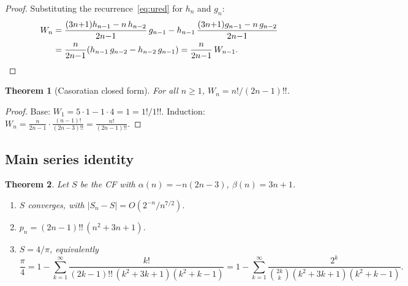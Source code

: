\documentclass[11pt,a4paper]{article}
\theoremstyle{plain}
\newtheorem{theorem}{Theorem}[section]
\theoremstyle{definition}
\theoremstyle{remark}
\newcommand{\dff}[1]{(#1)!!}
\begin{document}
\begin{proof}
Substituting the recurrence~\eqref{eq:ured} for $h_n$ and $g_n$:
\begin{align*}
  W_n
  &= \frac{(3n{+}1)h_{n-1} - n\,h_{n-2}}{2n{-}1}\,g_{n-1}
    - h_{n-1}\,\frac{(3n{+}1)g_{n-1} - n\,g_{n-2}}{2n{-}1} \\
  &= \frac{n}{2n{-}1}(h_{n-1}\,g_{n-2} - h_{n-2}\,g_{n-1})
   = \frac{n}{2n{-}1}\,W_{n-1}.\qedhere
\end{align*}
\end{proof}

\begin{theorem}[Casoratian closed form]\label{thm:cas}
For all $n \geq 1$,
$W_n = n!/\dff{2n{-}1}$.
\end{theorem}

\begin{proof}
Base: $W_1 = 5\cdot 1 - 1\cdot 4 = 1 = 1!/1!!$.
Induction:
$W_n = \frac{n}{2n{-}1}\cdot\frac{(n{-}1)!}{\dff{2n{-}3}}
= \frac{n!}{\dff{2n{-}1}}$.
\end{proof}

\subsection{Main series identity}

\begin{theorem}\label{thm:4overpi}
Let $S$ be the CF with $\alpha(n) = -n(2n{-}3)$,
$\beta(n) = 3n{+}1$.
\begin{enumerate}
\item[\textup{(i)}]
  $S$ converges, with $|S_n - S| = O(2^{-n}/n^{7/2})$.
\item[\textup{(ii)}]
  $p_n = \dff{2n{-}1}\,(n^2{+}3n{+}1)$.
\item[\textup{(iii)}]
  $S = 4/\pi$, equivalently
\begin{equation}\label{eq:series}
  \frac{\pi}{4}
  = 1 - \sum_{k=1}^{\infty}
    \frac{k!}{\dff{2k{-}1}\,(k^2{+}3k{+}1)(k^2{+}k{-}1)}
  = 1 - \sum_{k=1}^{\infty}
    \frac{2^k}{\binom{2k}{k}(k^2{+}3k{+}1)(k^2{+}k{-}1)}.
\end{equation}
\end{enumerate}
\end{theorem}
\end{document}
